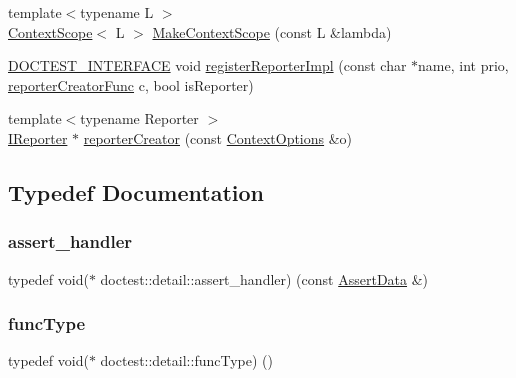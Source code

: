\begin{DoxyCompactItemize}
\item 
{\footnotesize template$<$typename L $>$ }\\\hyperlink{classdoctest_1_1detail_1_1_context_scope}{Context\+Scope}$<$ L $>$ \hyperlink{namespacedoctest_1_1detail_a193493f40330f096b9e1b78557a832a3}{Make\+Context\+Scope} (const L \&lambda)
\item 
\hyperlink{doctest_8h_a9c16ffc635ec47f07797d21ede26b1a5}{D\+O\+C\+T\+E\+S\+T\+\_\+\+I\+N\+T\+E\+R\+F\+A\+CE} void \hyperlink{namespacedoctest_1_1detail_a828e011bb6028ab94eb14a3c7d8bd2c4}{register\+Reporter\+Impl} (const char $\ast$name, int prio, \hyperlink{namespacedoctest_1_1detail_a030c0c44c25bdebe6a83858d1f454f72}{reporter\+Creator\+Func} c, bool is\+Reporter)
\item 
{\footnotesize template$<$typename Reporter $>$ }\\\hyperlink{structdoctest_1_1_i_reporter}{I\+Reporter} $\ast$ \hyperlink{namespacedoctest_1_1detail_a575cd92f018bfe3c702432a2144ebaca}{reporter\+Creator} (const \hyperlink{structdoctest_1_1_context_options}{Context\+Options} \&o)
\end{DoxyCompactItemize}


\subsection{Typedef Documentation}
\mbox{\label{namespacedoctest_1_1detail_a5b5db6997f20389de5735e3ee3439b95}} 
\subsubsection{\texorpdfstring{assert\+\_\+handler}{assert\_handler}}
{\footnotesize\ttfamily typedef void($\ast$ doctest\+::detail\+::assert\+\_\+handler) (const \hyperlink{structdoctest_1_1_assert_data}{Assert\+Data} \&)}

\mbox{\label{namespacedoctest_1_1detail_a7b2c60631c5f4906b26acf2e6b0e6e45}} 
\subsubsection{\texorpdfstring{func\+Type}{funcType}}
{\footnotesize\ttfamily typedef void($\ast$ doctest\+::detail\+::func\+Type) ()}

